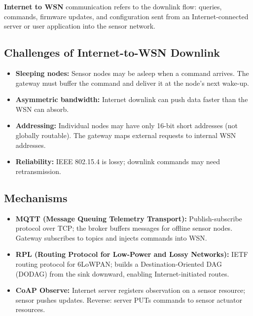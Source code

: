 \documentclass[12pt,a4paper]{article}
\begin{document}
\begin{tcolorbox}[defbox, title={\textbf{Internet-to-WSN Communication}}]
\textbf{Internet to WSN} communication refers to the downlink flow: queries, commands, firmware updates, and configuration sent from an Internet-connected server or user application into the sensor network.
\end{tcolorbox}

\subsection{Challenges of Internet-to-WSN Downlink}
\begin{itemize}[leftmargin=*, itemsep=3pt]
  \item \textbf{Sleeping nodes:} Sensor nodes may be asleep when a command arrives. The gateway must buffer the command and deliver it at the node's next wake-up.
  \item \textbf{Asymmetric bandwidth:} Internet downlink can push data faster than the WSN can absorb.
  \item \textbf{Addressing:} Individual nodes may have only 16-bit short addresses (not globally routable). The gateway maps external requests to internal WSN addresses.
  \item \textbf{Reliability:} IEEE 802.15.4 is lossy; downlink commands may need retransmission.
\end{itemize}

\subsection{Mechanisms}
\begin{itemize}[leftmargin=*, itemsep=3pt]
  \item \textbf{MQTT (Message Queuing Telemetry Transport):} Publish-subscribe protocol over TCP; the broker buffers messages for offline sensor nodes. Gateway subscribes to topics and injects commands into WSN.
  \item \textbf{RPL (Routing Protocol for Low-Power and Lossy Networks):} IETF routing protocol for 6LoWPAN; builds a Destination-Oriented DAG (DODAG) from the sink downward, enabling Internet-initiated routes.
  \item \textbf{CoAP Observe:} Internet server registers observation on a sensor resource; sensor pushes updates. Reverse: server PUTs commands to sensor actuator resources.
\end{itemize}

\end{document}
